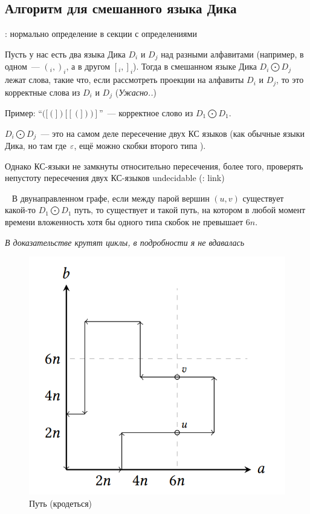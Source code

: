 \subsection{Алгоритм для смешанного языка Дика}

\begin{definition}
    \TODO: нормально определение в секции с определениями

    Пусть у нас есть два языка Дика $D_i$ и $D_j$ над разными алфавитами (например, в одном~--- $(_i, )_i$, а в другом $[_i, ]_i$). Тогда в смешанном языке Дика $D_i \bigodot D_j$ лежат слова, такие что, если рассмотреть проекции на алфавиты $D_i$ и $D_j$, то это корректные слова из $D_i$ и $D_j$ (\textit{Ужасно..})

    Пример: ``$([(])[[(]))]$''~--- корректное слово из $D_1 \bigodot D_1$. 
\end{definition}

\begin{note}
    $D_i \bigodot D_j$~--- это на самом деле пересечение двух КС языков (как обычные языки Дика, но там где $\varepsilon$, ещё можно скобки второго типа \TODO).

    Однако КС-языки не замкнуты относительно пересечения, более того, проверять непустоту пересечения двух КС-языков undecidable (\TODO: link)
\end{note}

\begin{lemma}~\cite{Li21}
    В двунаправленном графе, если между парой вершин $(u, v)$ существует какой-то $D_1 \bigodot D_1$ путь, то существует и такой путь, на котором в любой момент времени вложенность хотя бы одного типа скобок не превышает $6n$.

    \textit{В доказательстве крутят циклы, в подробности я не вдавалась}
\end{lemma}

\begin{figure}[H]
    \includegraphics[width=0.75\linewidth]{img/6n_6n_path}
    \caption{Путь (кродеться)}
\end{figure}


